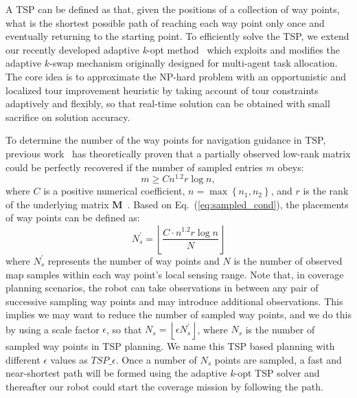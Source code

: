 A TSP 
can be defined as that, given the positions of a collection of way points, what is the shortest possible path of reaching each way point only once and eventually returning to the starting point. 
To efficiently solve the TSP, we extend our recently developed adaptive \textit{k}-opt method~\cite{ma2016adaptive} which exploits and modifies the adaptive $k$-swap mechanism originally designed for multi-agent
task allocation. The core idea is to approximate the NP-hard problem with an opportunistic and localized tour improvement heuristic by taking account of tour
constraints adaptively and flexibly, so that real-time solution can be obtained with small sacrifice on solution accuracy. 

To determine the number of the way points for navigation guidance in TSP, previous work~\cite{candes2009exact} has theoretically proven that a partially observed low-rank matrix could be perfectly recovered if the number of sampled entries $m$ obeys:
\begin{equation}
    \label{eq:sampled_cond}
        m\geq Cn^{1.2}r\log n,
\end{equation}
where $C$ is a positive numerical coefficient, $n = \max\left \{ n_1, n_2 \right \}$, and $r$ is the rank of the underlying matrix $\mathbf{M}$~\cite{candes2009exact}. Based on Eq.~(\ref{eq:sampled_cond}),
the placements of way points
can be defined
as:
\begin{equation}
    \label{eq:sample_num}
    N^{'}_{s} = \left \lfloor \frac{C\cdot n^{1.2}r\log n}{N} \right \rfloor
\end{equation}
where $N^{'}_{s}$ represents the number of way points and $N$ is the number of observed map samples within each way point's local sensing range. 
Note that, in coverage planning scenarios, the robot can take observations in between any pair of successive sampling way points and may introduce additional observations. This implies we may want to reduce the number of sampled way points, 
and we do this by using a scale factor $\epsilon$, so that $N_{s} = \left \lfloor \epsilon N^{'}_{s} \right \rfloor$, 
where $N_{s}$ is the number of sampled way points in TSP planning. 
We name this TSP based planning with different $\epsilon$ values as $TSP\_\epsilon$. 
Once a number of $N_{s}$ points are sampled, a fast and  near-shortest path will be formed using the adaptive \textit{k}-opt TSP solver and thereafter our robot could start the coverage mission by following the path. 


